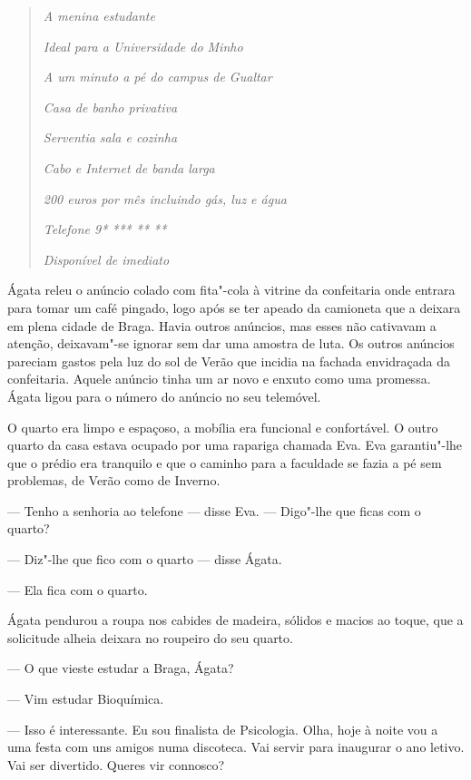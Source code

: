 \begin{quotation}

\emph{A menina estudante}

\emph{Ideal para a Universidade do Minho}

\emph{A um minuto a pé do campus de
Gualtar}

\emph{Casa de banho privativa}

\emph{Serventia sala e cozinha}

\emph{ Cabo e Internet de banda larga}

\emph{200 euros por mês incluindo gás,
luz e água}

\emph{Telefone 9* *** ** **}

\emph{Disponível de imediato}
\end{quotation}

Ágata releu o anúncio colado com fita"-cola à vitrine da confeitaria onde
entrara para tomar um café pingado, logo após se ter apeado da camioneta
que a deixara em plena cidade de Braga. Havia outros anúncios, mas esses
não cativavam a atenção, deixavam"-se ignorar sem dar uma amostra de
luta. Os outros anúncios pareciam gastos pela luz do sol de Verão que
incidia na fachada envidraçada da confeitaria. Aquele anúncio tinha um
ar novo e enxuto como uma promessa. Ágata ligou para o número do anúncio no seu telemóvel.

O quarto era limpo e espaçoso, a mobília era funcional e confortável. O
outro quarto da casa estava ocupado por uma rapariga chamada Eva. Eva
garantiu"-lhe que o prédio era tranquilo e que o caminho para a
faculdade se fazia a pé sem problemas, de Verão como de Inverno.

--- Tenho a senhoria ao telefone --- disse Eva. --- Digo"-lhe que ficas com
  o quarto?

--- Diz"-lhe que fico com o quarto --- disse Ágata.

--- Ela fica com o quarto.

Ágata pendurou a roupa nos cabides de madeira, sólidos e macios ao
toque, que a solicitude alheia deixara no roupeiro do seu quarto.

--- O que vieste estudar a Braga, Ágata?

--- Vim estudar Bioquímica.

--- Isso é interessante. Eu sou finalista de Psicologia. Olha, hoje à
  noite vou a uma festa com uns amigos numa discoteca. Vai servir para
  inaugurar o ano letivo. Vai ser divertido. Queres vir connosco?

